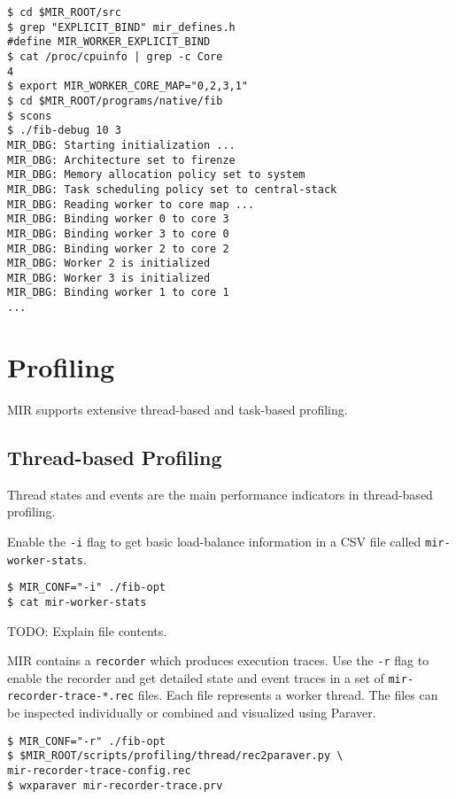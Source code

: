 \documentclass[11pt,a4paper]{article}
\begin{document}
\begin{lstlisting}[style=MyInputStyle]
$ cd $MIR_ROOT/src
$ grep "EXPLICIT_BIND" mir_defines.h
#define MIR_WORKER_EXPLICIT_BIND
$ cat /proc/cpuinfo | grep -c Core
4
$ export MIR_WORKER_CORE_MAP="0,2,3,1"
$ cd $MIR_ROOT/programs/native/fib
$ scons
$ ./fib-debug 10 3
MIR_DBG: Starting initialization ...
MIR_DBG: Architecture set to firenze
MIR_DBG: Memory allocation policy set to system
MIR_DBG: Task scheduling policy set to central-stack
MIR_DBG: Reading worker to core map ...
MIR_DBG: Binding worker 0 to core 3
MIR_DBG: Binding worker 3 to core 0
MIR_DBG: Binding worker 2 to core 2
MIR_DBG: Worker 2 is initialized
MIR_DBG: Worker 3 is initialized
MIR_DBG: Binding worker 1 to core 1
...
\end{lstlisting}

\section{Profiling}\label{profiling}

MIR supports extensive thread-based and task-based profiling.

\subsection{Thread-based Profiling}\label{thread-based-profiling}

Thread states and events are the main performance indicators in thread-based profiling.

Enable the \texttt{-i} flag to get basic load-balance information in a CSV file called \texttt{mir-worker-stats}.

\begin{lstlisting}[style=MyInputStyle]
$ MIR_CONF="-i" ./fib-opt
$ cat mir-worker-stats
\end{lstlisting}

TODO: Explain file contents.

MIR contains a \texttt{recorder} which produces execution traces. Use the \texttt{-r} flag to enable the recorder and get detailed state and event traces in a set of \texttt{mir-recorder-trace-*.rec} files.  Each file represents a worker thread. The files can be inspected individually or combined and visualized using Paraver.

\begin{lstlisting}[style=MyInputStyle]
$ MIR_CONF="-r" ./fib-opt
$ $MIR_ROOT/scripts/profiling/thread/rec2paraver.py \
mir-recorder-trace-config.rec
$ wxparaver mir-recorder-trace.prv
\end{lstlisting}
\end{document}
